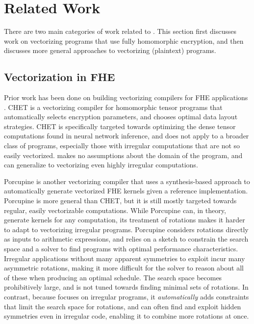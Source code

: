 \section{Related Work}\label{sec:related-work}
There are two main categories of work related to \system. This section first discusses work on vectorizing programs that use fully homomorphic encryption, and then discusses more general approaches to vectorizing (plaintext) programs.


\subsection{Vectorization in FHE}
Prior work has been done on building vectorizing compilers for FHE applications \cite{CHET, Porcupine}.
CHET \cite{CHET} is a vectorizing compiler for homomorphic tensor programs that automatically selects encryption parameters, and chooses optimal data layout strategies.
CHET is specifically targeted towards optimizing the dense tensor computations found in neural network inference, and does not apply to a broader class of programs, especially those with irregular computations that are not so easily vectorized.
\system makes no assumptions about the domain of the program, and can generalize to vectorizing even highly irregular computations.

Porcupine \cite{Porcupine} is another vectorizing compiler that uses a synthesis-based approach to automatically generate vectorized FHE kernels given a reference implementation.
Porcupine is more general than CHET, but it is still mostly targeted towards regular, easily vectorizable computations.
While Porcupine can, in theory, generate kernels for any computation, its treatment of rotations makes it harder to adapt to vectorizing irregular programs.
Porcupine considers rotations directly as inputs to arithmetic expressions, and relies on a sketch to constrain the search space and a solver to find programs with optimal performance characteristics.
Irregular applications without many apparent symmetries to exploit incur many asymmetric rotations, making it more difficult for the solver to reason about all of these when producing an optimal schedule. The search space becomes prohibitively large, and is not tuned towards finding minimal sets of rotations.
In contrast, because \system focuses on irregular programs, it {\em automatically} adds constraints that limit the search space for rotations, and can often find and exploit hidden symmetries even in irregular code, enabling it to combine more rotations at once.

